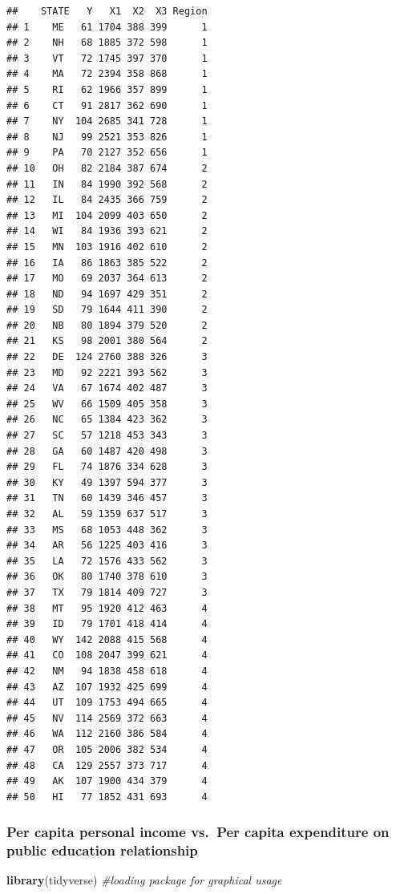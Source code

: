 \documentclass[]{article}
\newenvironment{Shaded}{\begin{snugshade}}{\end{snugshade}}
\newcommand{\CommentTok}[1]{\textcolor[rgb]{0.56,0.35,0.01}{\textit{#1}}}
\newcommand{\KeywordTok}[1]{\textcolor[rgb]{0.13,0.29,0.53}{\textbf{#1}}}
\newcommand{\NormalTok}[1]{#1}
\begin{document}
\begin{verbatim}
##    STATE   Y   X1  X2  X3 Region
## 1    ME   61 1704 388 399      1
## 2    NH   68 1885 372 598      1
## 3    VT   72 1745 397 370      1
## 4    MA   72 2394 358 868      1
## 5    RI   62 1966 357 899      1
## 6    CT   91 2817 362 690      1
## 7    NY  104 2685 341 728      1
## 8    NJ   99 2521 353 826      1
## 9    PA   70 2127 352 656      1
## 10   OH   82 2184 387 674      2
## 11   IN   84 1990 392 568      2
## 12   IL   84 2435 366 759      2
## 13   MI  104 2099 403 650      2
## 14   WI   84 1936 393 621      2
## 15   MN  103 1916 402 610      2
## 16   IA   86 1863 385 522      2
## 17   MO   69 2037 364 613      2
## 18   ND   94 1697 429 351      2
## 19   SD   79 1644 411 390      2
## 20   NB   80 1894 379 520      2
## 21   KS   98 2001 380 564      2
## 22   DE  124 2760 388 326      3
## 23   MD   92 2221 393 562      3
## 24   VA   67 1674 402 487      3
## 25   WV   66 1509 405 358      3
## 26   NC   65 1384 423 362      3
## 27   SC   57 1218 453 343      3
## 28   GA   60 1487 420 498      3
## 29   FL   74 1876 334 628      3
## 30   KY   49 1397 594 377      3
## 31   TN   60 1439 346 457      3
## 32   AL   59 1359 637 517      3
## 33   MS   68 1053 448 362      3
## 34   AR   56 1225 403 416      3
## 35   LA   72 1576 433 562      3
## 36   OK   80 1740 378 610      3
## 37   TX   79 1814 409 727      3
## 38   MT   95 1920 412 463      4
## 39   ID   79 1701 418 414      4
## 40   WY  142 2088 415 568      4
## 41   CO  108 2047 399 621      4
## 42   NM   94 1838 458 618      4
## 43   AZ  107 1932 425 699      4
## 44   UT  109 1753 494 665      4
## 45   NV  114 2569 372 663      4
## 46   WA  112 2160 386 584      4
## 47   OR  105 2006 382 534      4
## 48   CA  129 2557 373 717      4
## 49   AK  107 1900 434 379      4
## 50   HI   77 1852 431 693      4
\end{verbatim}

\hypertarget{per-capita-personal-income-vs.-per-capita-expenditure-on-public-education-relationship}{%
\subsubsection{Per capita personal income vs.~Per capita expenditure on
public education
relationship}\label{per-capita-personal-income-vs.-per-capita-expenditure-on-public-education-relationship}}

\begin{Shaded}
\begin{Highlighting}[]
\KeywordTok{library}\NormalTok{(tidyverse) }\CommentTok{#loading package for graphical usage}
\end{Highlighting}
\end{Shaded}
\end{document}
